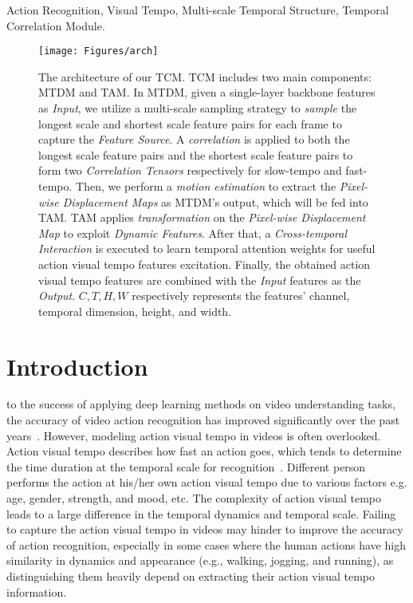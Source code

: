 \documentclass[journal]{IEEEtran}
\begin{document}
\begin{IEEEkeywords}
Action Recognition, Visual Tempo, Multi-scale Temporal Structure, Temporal Correlation Module.
\end{IEEEkeywords}

\IEEEpeerreviewmaketitle

\begin{figure*}[tbp]
  \texttt{[image: Figures/arch]}
  \caption{The architecture of our TCM. TCM includes two main components: MTDM and TAM. In MTDM, given a single-layer backbone features as \textit{Input}, we utilize a multi-scale sampling strategy to \textit{sample} the longest scale and shortest scale feature pairs for each frame to capture the \textit{Feature Source}. A \textit{correlation} is applied to both the longest scale feature pairs and the shortest scale feature pairs to form two \textit{Correlation Tensors} respectively for slow-tempo and fast-tempo. Then, we perform a \textit{motion estimation} to extract the \textit{Pixel-wise Displacement Maps} as MTDM's output, which will be fed into TAM. TAM applies \textit{transformation} on the \textit{Pixel-wise Displacement Map} to exploit \textit{Dynamic Features}. After that, a \textit{Cross-temporal Interaction} is executed to learn temporal attention weights for useful action visual tempo features excitation. Finally, the obtained action visual tempo features are combined with the \textit{Input} features as the \textit{Output}. $C, T, H, W$ respectively represents the features' channel, temporal dimension, height, and width.}
  \label{fig:arch}
\end{figure*}


\section{Introduction}
 to the success of applying deep learning methods on video understanding tasks, the accuracy of video action recognition has improved significantly over the past years~\cite{simonyan2014two,t2016du,girdhar2019video,feichtenhofer2020x3d,arnab2021vivit}. However, modeling action visual tempo in videos is often overlooked. Action visual tempo describes how fast an action goes, which tends to determine the time duration at the temporal scale for recognition~\cite{yang2020temporal}. Different person performs the action at his/her own action visual tempo due to various factors e.g. age, gender, strength, and mood, etc. The complexity of action visual tempo leads to a large difference in the temporal dynamics and temporal scale. Failing to capture the action visual tempo in videos may hinder to improve the accuracy of action recognition, especially in some cases where the human actions have high similarity in dynamics and appearance (e.g., walking, jogging, and running), as distinguishing them heavily depend on extracting their action visual tempo information.
\end{document}
